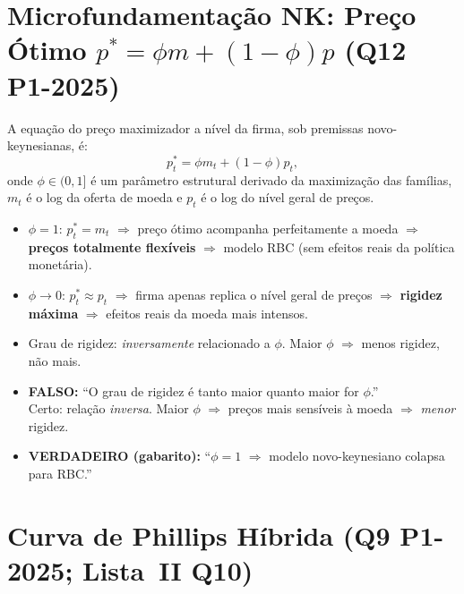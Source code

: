 \documentclass[12pt, a4paper]{article}
\begin{document}
\section{Microfundamentação NK: Preço Ótimo $p^* = \phi m + (1-\phi)p$ (Q12 P1-2025)}

A equação do preço maximizador a nível da firma, sob premissas novo-keynesianas, é:
\[
  p_t^* = \phi m_t + (1-\phi) p_t,
\]
onde $\phi \in (0,1]$ é um parâmetro estrutural derivado da maximização das famílias, $m_t$ é o log da oferta de moeda e $p_t$ é o log do nível geral de preços.

\begin{fatorbox}[title={Interpretação de $\phi$ — casos extremos}]
\begin{itemize}[leftmargin=*]
  \item $\phi = 1$: $p_t^* = m_t$ $\Rightarrow$ preço ótimo acompanha perfeitamente a moeda $\Rightarrow$ \textbf{preços totalmente flexíveis} $\Rightarrow$ modelo RBC (sem efeitos reais da política monetária).
  \item $\phi \to 0$: $p_t^* \approx p_t$ $\Rightarrow$ firma apenas replica o nível geral de preços $\Rightarrow$ \textbf{rigidez máxima} $\Rightarrow$ efeitos reais da moeda mais intensos.
  \item Grau de rigidez: \emph{inversamente} relacionado a $\phi$. Maior $\phi$ $\Rightarrow$ menos rigidez, não mais.
\end{itemize}
\end{fatorbox}

\begin{armbox}[title={Armadilha direta (Q12 — resposta correta = d)}]
\begin{itemize}[leftmargin=*]
  \item \textbf{FALSO:} ``O grau de rigidez é tanto maior quanto maior for $\phi$.'' \\ Certo: relação \emph{inversa}. Maior $\phi$ $\Rightarrow$ preços mais sensíveis à moeda $\Rightarrow$ \emph{menor} rigidez.
  \item \textbf{VERDADEIRO (gabarito):} ``$\phi = 1$ $\Rightarrow$ modelo novo-keynesiano colapsa para RBC.''
\end{itemize}
\end{armbox}

\section{Curva de Phillips Híbrida (Q9 P1-2025; Lista~II Q10)}
\end{document}

